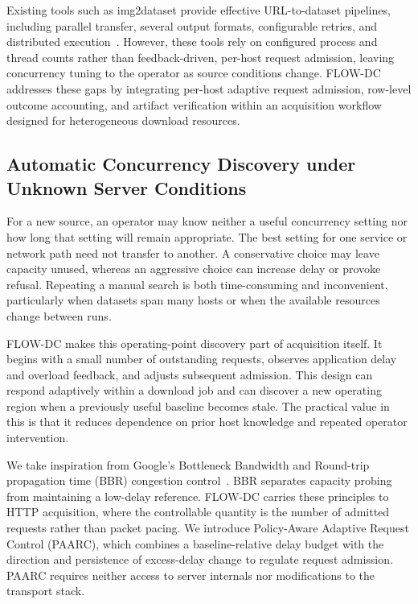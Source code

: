 Existing tools such as img2dataset provide effective URL-to-dataset pipelines, including parallel transfer, several output formats, configurable retries, and distributed execution~\cite{img2dataset}. However, these tools rely on configured process and thread counts rather than feedback-driven, per-host request admission, leaving concurrency tuning to the operator as source conditions change. FLOW-DC addresses these gaps by integrating per-host adaptive request admission, row-level outcome accounting, and artifact verification within an acquisition workflow designed for heterogeneous download resources.

\subsection{Automatic Concurrency Discovery under Unknown Server Conditions}
For a new source, an operator may know neither a useful concurrency setting nor how long that setting will remain appropriate. The best setting for one service or network path need not transfer to another. A conservative choice may leave capacity unused, whereas an aggressive choice can increase delay or provoke refusal. Repeating a manual search is both time-consuming and inconvenient, particularly when datasets span many hosts or when the available resources change between runs.

FLOW-DC makes this operating-point discovery part of acquisition itself. It begins with a small number of outstanding requests, observes application delay and overload feedback, and adjusts subsequent admission. This design can respond adaptively within a download job and can discover a new operating region when a previously useful baseline becomes stale. The practical value in this is that it reduces dependence on prior host knowledge and repeated operator intervention.

We take inspiration from Google's Bottleneck Bandwidth and Round-trip propagation time (BBR) congestion control~\cite{bbr}. BBR separates capacity probing from maintaining a low-delay reference. FLOW-DC carries these principles to HTTP acquisition, where the controllable quantity is the number of admitted requests rather than packet pacing. We introduce Policy-Aware Adaptive Request Control (PAARC), which combines a baseline-relative delay budget with the direction and persistence of excess-delay change to regulate request admission. PAARC requires neither access to server internals nor modifications to the transport stack.

